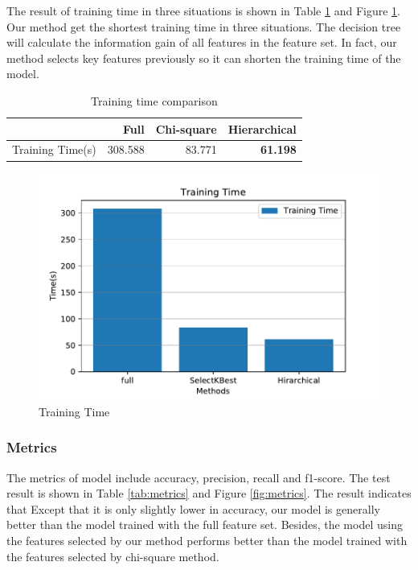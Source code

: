 \documentclass[journal]{IEEEtran}
\begin{document}
The result of training time in three situations is shown in Table \ref{tab:time} and Figure \ref{fig:training-time}. Our method get the shortest training time in three situations. The decision tree will calculate the information gain of all features in the feature set. In fact, our method selects key features previously so it can shorten the training time of the model. 

\begin{table}[!htpb]
    \caption{Training time comparison}
    \label{tab:time}
    \centering
    \begin{tabular}{crrr}
    \toprule
        & Full & Chi-square & Hierarchical \\
    \midrule
    Training Time(s) & 308.588 & 83.771 & \textbf{61.198} \\
    \bottomrule
    \end{tabular}
\end{table}

\begin{figure}[!htbp]
    \centering
    \includegraphics[scale=0.5]{fig/Training-Time.pdf}
    \caption{Training Time}
    \label{fig:training-time}
\end{figure}

\subsubsection{Metrics}

The metrics of model include accuracy, precision, recall and f1-score. The test result is shown in Table \ref{tab:metrics} and Figure \ref{fig:metrics}. The result indicates that Except that it is only slightly lower in accuracy, our model is generally better than the model trained with the full feature set. Besides, the model using the features selected by our method performs better than the model trained with the features selected by chi-square method.
\end{document}
